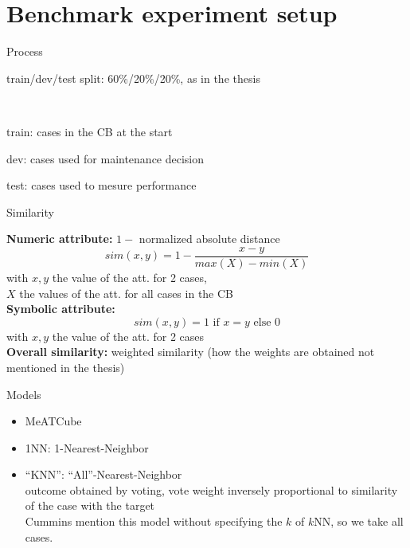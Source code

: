 \documentclass[]{beamer}
\begin{document}
\section{Benchmark experiment setup}
\begin{frame}{Process}

    train/dev/test split: 60\%/20\%/20\%, as in the thesis

    ~

    train: cases in the CB at the start

    dev: cases used for maintenance decision

    test: cases used to mesure performance
    
\end{frame}
\begin{frame}{Similarity}

    \textbf{Numeric attribute:} $1 -$ normalized absolute distance
    $$sim(x,y) = 1 - \frac{x-y}{max(X) - min(X)}$$
    with $x,y$ the value of the att. for 2 cases,\\
    $X$ the values of the att. for all cases in the CB
    \\[2em]

    \textbf{Symbolic attribute:}
    $$sim(x,y) = 1 \text{ if } x=y \text{ else } 0$$
    with $x,y$ the value of the att. for 2 cases
    \\[2em]

    \textbf{Overall similarity:}
    weighted similarity (how the weights are obtained not mentioned in the thesis)

\end{frame}
\begin{frame}{Models}

    
    \begin{itemize}
        \item MeATCube
        \item 1NN: 1-Nearest-Neighbor
        \item ``KNN'': ``All''-Nearest-Neighbor\\
        outcome obtained by voting, vote weight inversely proportional to similarity of the case with the target\\
        Cummins mention this model without specifying the $k$ of $k$NN, so we take all cases. 
    \end{itemize}

\end{frame}
\end{document}
